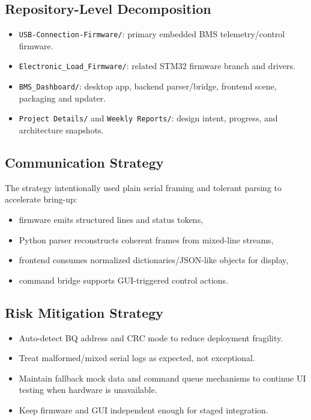 \documentclass[12pt]{article}
\begin{document}
\subsection{Repository-Level Decomposition}
\begin{itemize}[leftmargin=1.2cm]
    \item \texttt{USB-Connection-Firmware/}: primary embedded BMS telemetry/control firmware.
    \item \texttt{Electronic\_Load\_Firmware/}: related STM32 firmware branch and drivers.
    \item \texttt{BMS\_Dashboard/}: desktop app, backend parser/bridge, frontend scene, packaging and updater.
    \item \texttt{Project Details/} and \texttt{Weekly Reports/}: design intent, progress, and architecture snapshots.
\end{itemize}

\subsection{Communication Strategy}
The strategy intentionally used plain serial framing and tolerant parsing to accelerate bring-up:
\begin{itemize}[leftmargin=1.2cm]
    \item firmware emits structured lines and status tokens,
    \item Python parser reconstructs coherent frames from mixed-line streams,
    \item frontend consumes normalized dictionaries/JSON-like objects for display,
    \item command bridge supports GUI-triggered control actions.
\end{itemize}

\subsection{Risk Mitigation Strategy}
\begin{itemize}[leftmargin=1.2cm]
    \item Auto-detect BQ address and CRC mode to reduce deployment fragility.
    \item Treat malformed/mixed serial logs as expected, not exceptional.
    \item Maintain fallback mock data and command queue mechanisms to continue UI testing when hardware is unavailable.
    \item Keep firmware and GUI independent enough for staged integration.
\end{itemize}
\end{document}

